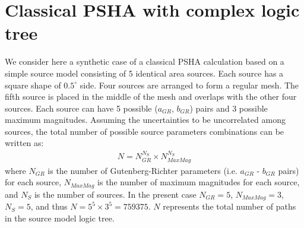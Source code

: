 \section{Classical PSHA with complex logic tree}
We consider here a synthetic case of a classical PSHA calculation based on a
simple source model consisting of 5 identical area sources. Each source has a
square shape of $0.5^{\circ}$ side. Four sources are arranged to form a regular
mesh. The fifth source is placed in the middle of the mesh and overlaps with the
other four sources. Each source can have 5 possible ($a_{GR}$, $b_{GR}$) pairs
and 3 possible maximum magnitudes. Assuming the uncertainties to be uncorrelated
among sources, the total number of possible source parameters combinations can
be written as:
\begin{align}
N = N_{GR}^{N_{S}} \times N_{MaxMag}^{N_{S}}
\end{align}
where $N_{GR}$ is the number of Gutenberg-Richter parameters (i.e. $a_{GR}$ -
$b_{GR}$ pairs) for each source, $N_{MaxMag}$ is the number of maximum
magnitudes for each source, and $N_{S}$ is the number of sources. In the present
case $N_{GR}=5$, $N_{MaxMag}=3$, $N_{S}=5$, and thus $N=5^{5} \times
3^{5}=759375$. $N$ represents the total number of paths in the source model
logic tree.

